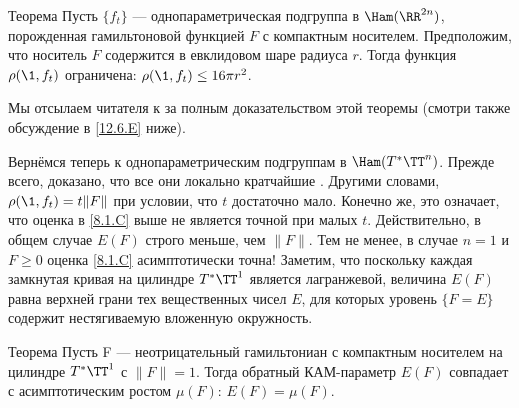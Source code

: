 \begin{thm}{Теорема}\label{8.2.A}
Пусть $\{f_t\}$ --- однопараметрическая подгруппа в $\Ham (\RR^{2n})$,
порожденная гамильтоновой функцией $F$ с компактным носителем. 
Предположим, что носитель $F$ содержится в евклидовом шаре радиуса
$r$. 
Тогда функция $\rho (\1, f_t)$ ограничена: $\rho (\1, f_t) \le 16\pi
r^2$. 
\end{thm}

Мы отсылаем читателя к \cite[с. 177]{HZ} за полным доказательством
этой теоремы (смотри также обсуждение в \ref{12.6.E} ниже). 

Вернёмся теперь к однопараметрическим подгруппам в $\Ham (T^\ast \TT^n)$.
Прежде всего, доказано, что все они локально кратчайшие \cite{LM2}.
Другими словами, $\rho (\1, f_t) = t \| F \|$ при условии, что $t$
достаточно мало. 
Конечно же, это означает, что оценка в \ref{8.1.C} выше не является
точной при малых $t$. 
Действительно, в общем случае $E (F)$ строго меньше, чем $\| F \|$.
Тем не менее, в случае $n = 1$ и $F \ge 0$ оценка \ref{8.1.C}
асимптотически точна! 
Заметим, что поскольку каждая замкнутая кривая на цилиндре $T^\ast
\TT^1$ является лагранжевой, величина $E (F)$ равна верхней грани тех
вещественных чисел $E$, для которых уровень $\{F = E\}$ содержит
нестягиваемую вложенную окружность. 

\begin{thm}[(\cite{PS})]{Теорема}\label{8.2.B}
  Пусть F --- неотрицательный гамильтониан с компактным носителем на
  цилиндре $T^\ast \TT^1$ с $\| F \| = 1$. 
  Тогда обратный КАМ-параметр $E (F)$ совпадает с асимптотическим
  ростом $\mu (F)$: $E (F) = \mu (F)$. 
\end{thm}


